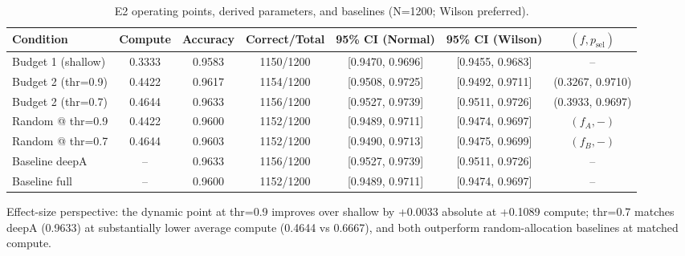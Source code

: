 \begin{table}[H]
  \centering
  \caption{E2 operating points, derived parameters, and baselines (N=1200; Wilson preferred).}
  \vspace{0.25em}
  \begin{adjustbox}{width=\linewidth}
  \begin{tabular}{l c c c c c c}
    \toprule
    Condition & Compute & Accuracy & Correct/Total & 95\% CI (Normal) & 95\% CI (Wilson) & $(f, p_{\mathrm{sel}})$ \\
    \midrule
    Budget 1 (shallow) & 0.3333 & 0.9583 & 1150/1200 & [0.9470, 0.9696] & [0.9455, 0.9683] & -- \\
    Budget 2 (thr=0.9) & 0.4422 & 0.9617 & 1154/1200 & [0.9508, 0.9725] & [0.9492, 0.9711] & (0.3267, 0.9710) \\
    Budget 2 (thr=0.7) & 0.4644 & 0.9633 & 1156/1200 & [0.9527, 0.9739] & [0.9511, 0.9726] & (0.3933, 0.9697) \\
    \midrule
    Random @ thr=0.9 & 0.4422 & 0.9600 & 1152/1200 & [0.9489, 0.9711] & [0.9474, 0.9697] & $(f_A, -)$ \\
    Random @ thr=0.7 & 0.4644 & 0.9603 & 1152/1200 & [0.9490, 0.9713] & [0.9475, 0.9699] & $(f_B, -)$ \\
    Baseline deepA & -- & 0.9633 & 1156/1200 & [0.9527, 0.9739] & [0.9511, 0.9726] & -- \\
    Baseline full  & -- & 0.9600 & 1152/1200 & [0.9489, 0.9711] & [0.9474, 0.9697] & -- \\
    \bottomrule
  \end{tabular}
  \end{adjustbox}
\end{table}

Effect-size perspective: the dynamic point at thr=0.9 improves over shallow by +0.0033 absolute at +0.1089 compute; thr=0.7 matches deepA (0.9633) at substantially lower average compute (0.4644 vs 0.6667), and both outperform random-allocation baselines at matched compute.


